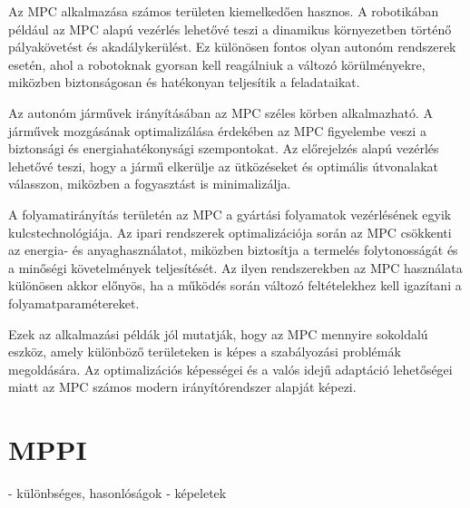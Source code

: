 Az MPC alkalmazása számos területen kiemelkedően hasznos. A robotikában például az MPC alapú vezérlés lehetővé teszi a dinamikus környezetben történő pályakövetést és akadálykerülést. Ez különösen fontos olyan autonóm rendszerek esetén, ahol a robotoknak gyorsan kell reagálniuk a változó körülményekre, miközben biztonságosan és hatékonyan teljesítik a feladataikat.

Az autonóm járművek irányításában az MPC széles körben alkalmazható. A járművek mozgásának optimalizálása érdekében az MPC figyelembe veszi a biztonsági és energiahatékonysági szempontokat. Az előrejelzés alapú vezérlés lehetővé teszi, hogy a jármű elkerülje az ütközéseket és optimális útvonalakat válasszon, miközben a fogyasztást is minimalizálja.

A folyamatirányítás területén az MPC a gyártási folyamatok vezérlésének egyik kulcstechnológiája. Az ipari rendszerek optimalizációja során az MPC csökkenti az energia- és anyaghasználatot, miközben biztosítja a termelés folytonosságát és a minőségi követelmények teljesítését. Az ilyen rendszerekben az MPC használata különösen akkor előnyös, ha a működés során változó feltételekhez kell igazítani a folyamatparamétereket.

Ezek az alkalmazási példák jól mutatják, hogy az MPC mennyire sokoldalú eszköz, amely különböző területeken is képes a szabályozási problémák megoldására. Az optimalizációs képességei és a valós idejű adaptáció lehetőségei miatt az MPC számos modern irányítórendszer alapját képezi.

\section{MPPI}
- különbséges, hasonlóságok
- képeletek